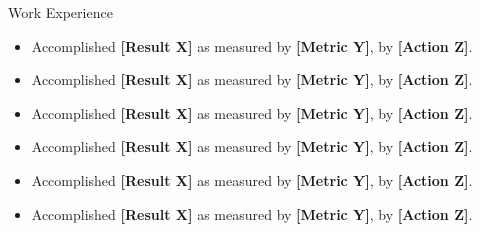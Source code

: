 \documentclass{resume} %
\begin{document}
\begin{rSection}{Work Experience}
\begin{rSubsection}
\begin{itemize}[left=-1.5em, labelsep=.1cm, labelwidth=.2cm, itemsep=0.0em]
\item Accomplished \textbf{[Result X]} as measured by \textbf{[Metric Y]}, by \textbf{[Action Z]}.
\item Accomplished \textbf{[Result X]} as measured by \textbf{[Metric Y]}, by \textbf{[Action Z]}.
\item Accomplished \textbf{[Result X]} as measured by \textbf{[Metric Y]}, by \textbf{[Action Z]}.
\item Accomplished \textbf{[Result X]} as measured by \textbf{[Metric Y]}, by \textbf{[Action Z]}.
\item Accomplished \textbf{[Result X]} as measured by \textbf{[Metric Y]}, by \textbf{[Action Z]}.
\item Accomplished \textbf{[Result X]} as measured by \textbf{[Metric Y]}, by \textbf{[Action Z]}.
\end{itemize}

\end{rSubsection}


\end{rSection}
\vspace{0.25em}
\end{document}
